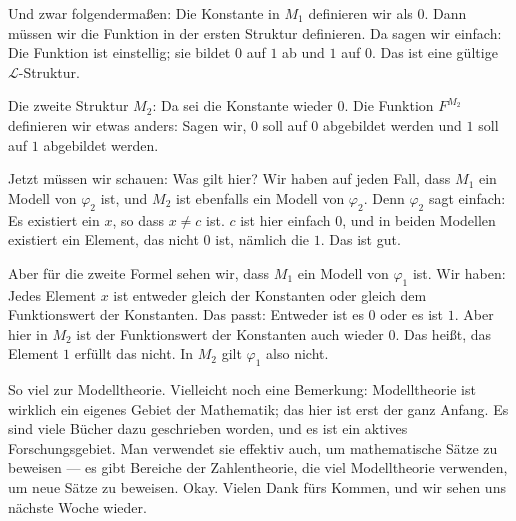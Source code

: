 \begin{spoken-clean}[01:25:32 - 01:27:03]
Und zwar folgendermaßen: Die Konstante in $M_1$ definieren wir als $0$. Dann müssen wir die Funktion in der ersten Struktur definieren. Da sagen wir einfach: Die Funktion ist einstellig; sie bildet $0$ auf $1$ ab und $1$ auf $0$. Das ist eine gültige $\mathcal{L}$-Struktur.

Die zweite Struktur $M_2$: Da sei die Konstante wieder $0$. Die Funktion $F^{M_2}$ definieren wir etwas anders: Sagen wir, $0$ soll auf $0$ abgebildet werden und $1$ soll auf $1$ abgebildet werden.

Jetzt müssen wir schauen: Was gilt hier? Wir haben auf jeden Fall, dass $M_1$ ein Modell von $\varphi_2$ ist, und $M_2$ ist ebenfalls ein Modell von $\varphi_2$. Denn $\varphi_2$ sagt einfach: Es existiert ein $x$, so dass $x \neq c$ ist. $c$ ist hier einfach $0$, und in beiden Modellen existiert ein Element, das nicht $0$ ist, nämlich die $1$. Das ist gut.

Aber für die zweite Formel sehen wir, dass $M_1$ ein Modell von $\varphi_1$ ist. Wir haben: Jedes Element $x$ ist entweder gleich der Konstanten oder gleich dem Funktionswert der Konstanten. Das passt: Entweder ist es $0$ oder es ist $1$. Aber hier in $M_2$ ist der Funktionswert der Konstanten auch wieder $0$. Das heißt, das Element $1$ erfüllt das nicht. In $M_2$ gilt $\varphi_1$ also nicht.

So viel zur Modelltheorie. Vielleicht noch eine Bemerkung: Modelltheorie ist wirklich ein eigenes Gebiet der Mathematik; das hier ist erst der ganz Anfang. Es sind viele Bücher dazu geschrieben worden, und es ist ein aktives Forschungsgebiet. Man verwendet sie effektiv auch, um mathematische Sätze zu beweisen --- es gibt Bereiche der Zahlentheorie, die viel Modelltheorie verwenden, um neue Sätze zu beweisen. Okay. Vielen Dank fürs Kommen, und wir sehen uns nächste Woche wieder.
\end{spoken-clean}

